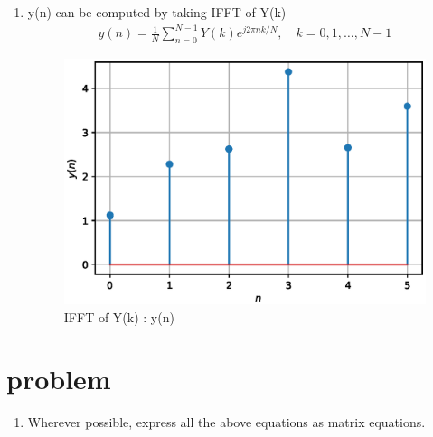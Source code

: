 \documentclass[journal,12pt,twocolumn]{IEEEtran}
\renewcommand\thesection{\arabic{section}}
\begin{document}
\begin{enumerate}[label=\thesection.\arabic*.,ref=\thesection.\theenumi]
\item y(n) can be computed by taking IFFT of Y(k)
\begin{align}
    y(n) = \frac{1}{N}\sum_{n=0}^{N-1}Y(k) e^{j 2 \pi n k / N}, \quad k=0,1, \ldots, N-1
\end{align}


\begin{figure}[h!]
    \centering
    \includegraphics[width=\columnwidth]{./figs/y_n.eps}
    \caption{IFFT of Y(k) : y(n)}
    \label{yn}
\end{figure}
\end{enumerate}

\section{problem}
\begin{enumerate}[label=\thesection.\arabic*.,ref=\thesection.\theenumi]
    \item Wherever possible, express all the above equations as matrix equations.
\end{enumerate}
\end{document}

